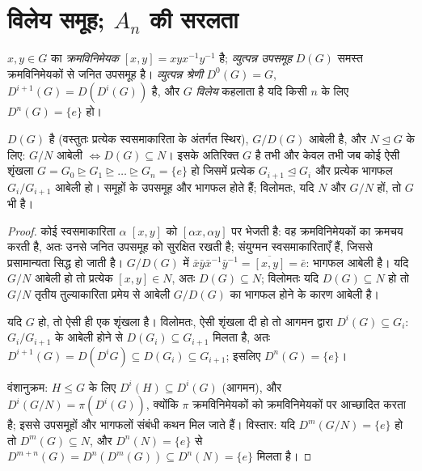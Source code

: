 \section{विलेय समूह; \texorpdfstring{$A_n$}{An} की सरलता}

\begin{definition}\label{def:b3:groups:derived}
$x, y \in G$ का \emph{क्रमविनिमेयक} $[x,y]
= xyx^{-1}y^{-1}$ है;
\emph{व्युत्पन्न उपसमूह} $D(G)$ समस्त
क्रमविनिमेयकों से जनित उपसमूह है। \emph{व्युत्पन्न श्रेणी}
$D^0(G) = G$, $D^{i+1}(G) = D(D^i(G))$ है, और $G$ \emph{विलेय} कहलाता
है यदि किसी $n$ के लिए $D^n(G) =
\{e\}$ हो।
\end{definition}

\begin{proposition}\label{prop:b3:groups:derived}
$D(G)$  है (वस्तुतः प्रत्येक स्वसमाकारिता के अंतर्गत
स्थिर), $G/D(G)$ आबेली है, और $N \trianglelefteq G$ के लिए: $G/N$ आबेली $\iff
D(G) \subseteq N$।
इसके अतिरिक्त $G$  है तभी और केवल तभी जब कोई ऐसी शृंखला
$G = G_0 \trianglerighteq G_1 \trianglerighteq \dots
\trianglerighteq G_n = \{e\}$ हो जिसमें प्रत्येक $G_{i+1} \trianglelefteq
G_i$ और प्रत्येक भागफल $G_i/G_{i+1}$ आबेली हो।
 समूहों के उपसमूह और भागफल  होते हैं; विलोमतः, यदि
$N$ और $G/N$  हों, तो $G$ भी  है।
\end{proposition}

\begin{proof}
कोई स्वसमाकारिता $\alpha$ $[x,y]$ को $[\alpha x, \alpha y]$ पर भेजती है: वह
क्रमविनिमेयकों का क्रमचय करती है, अतः उनसे जनित उपसमूह को
सुरक्षित रखती है; संयुग्मन स्वसमाकारिताएँ हैं, जिससे प्रसामान्यता
सिद्ध हो जाती है। $G/D(G)$ में $\bar x\bar y \bar x^{-1}\bar y^{-1} = \overline{[x,y]} = \bar e$: भागफल आबेली है। यदि $G/N$
आबेली हो तो प्रत्येक $[x,y] \in
N$, अतः $D(G) \subseteq N$; विलोमतः यदि $D(G) \subseteq N$ हो तो
$G/N$ तृतीय तुल्याकारिता प्रमेय से आबेली $G/D(G)$ का भागफल होने के
कारण आबेली है।

यदि $G$  हो, तो  ऐसी ही एक शृंखला है।
विलोमतः, ऐसी शृंखला दी हो तो आगमन द्वारा $D^i(G) \subseteq G_i$: $G_i/G_{i+1}$ के आबेली
होने से $D(G_i) \subseteq G_{i+1}$ मिलता है, अतः $D^{i+1}(G) = D(D^i G)
\subseteq D(G_i) \subseteq G_{i+1}$; इसलिए $D^n(G) = \{e\}$।

वंशानुक्रम: $H \leq G$ के लिए $D^i(H) \subseteq D^i(G)$ (आगमन), और $D^i(G/N) = \pi(D^i(G))$, क्योंकि $\pi$
क्रमविनिमेयकों को क्रमविनिमेयकों पर आच्छादित करता है; इससे
उपसमूहों और भागफलों संबंधी कथन मिल जाते हैं। विस्तार: यदि $D^m(G/N) = \{e\}$
हो तो $D^m(G) \subseteq N$, और $D^n(N) = \{e\}$ से $D^{m+n}(G) = D^n(D^m(G)) \subseteq D^n(N)
= \{e\}$ मिलता है।
\end{proof}

